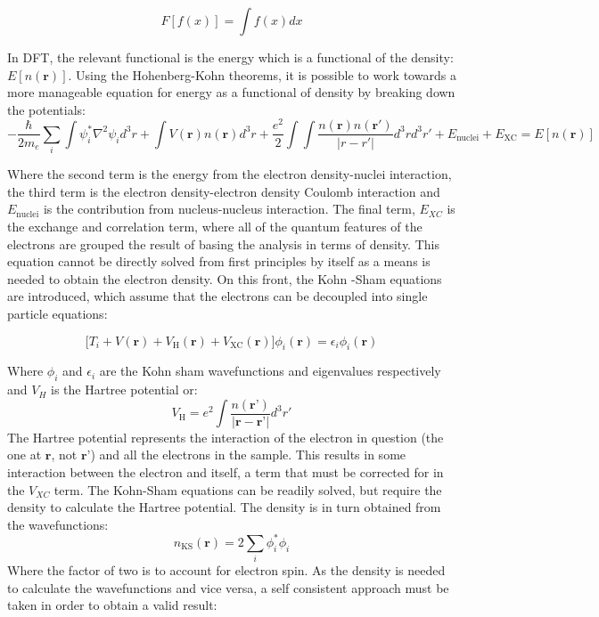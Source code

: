\begin{equation}
F[f(x)] = \int f(x) dx
\end{equation}

 In DFT, the relevant functional is the energy which is a functional of the density: $E[n(\textbf{r})]$.  Using the Hohenberg-Kohn theorems, it is possible to work towards a more manageable equation for energy as a functional of density by breaking down the potentials: 
\begin{equation}
-\frac{\hbar}{2m_e} \sum_{i} \int \psi_i^* \nabla^2\psi_id^3r + \int V(\textbf{r})n(\textbf{r})d^3r + \frac{e^2}{2} \int \int \frac{n(\textbf{r})n(\textbf{r}')}{|r-r'|}d^3r d^3r' + E_{\mathrm{nuclei}} + E_{\mathrm{XC}} = E[n(\textbf{r})]
\end{equation}

Where the second term is the energy from the electron density-nuclei interaction, the third term is the electron density-electron density Coulomb interaction and $E_{\mathrm{nuclei}}$ is the contribution from nucleus-nucleus interaction.  The final term, $E_{XC}$ is the exchange and correlation term, where all of the quantum features of the electrons are grouped the result of basing the analysis in terms of density. This equation cannot be directly solved from first principles by itself as a means is needed to obtain the electron density.  On this front, the Kohn -Sham equations are introduced, which assume that the electrons can be decoupled into single particle equations: 

\begin{equation}
    \bigg[T_i + V(\textbf{r}) + V_{\mathrm{H}}(\textbf{r}) + V_{\mathrm{XC}}(\textbf{r})\bigg] \phi_i(\textbf{r}) = \epsilon_i \phi_i(\textbf{r})
    \label{ks_eq}
\end{equation}

Where $\phi_i$ and $\epsilon_i$ are the Kohn sham wavefunctions and eigenvalues respectively and $V_H$ is the Hartree potential or: 
\begin{equation}
    V_\mathrm{H} = e^2 \int \frac{n(\textbf{r'})}{|\textbf{r}-\textbf{r'}|}d^3r'
\end{equation}
The Hartree potential represents the interaction of the electron in question (the one at $\textbf{r}$, not $\textbf{r'}$) and all the electrons in the sample.  This results in some interaction between the electron and itself, a term that must be corrected for in the $V_{XC}$ term.  The Kohn-Sham equations can  be readily solved, but require the density to calculate the Hartree potential.  The density is in turn obtained from the wavefunctions: 
\begin{equation}
	n_{\mathrm{KS}}(\textbf{r}) = 2 \sum_{i} \phi_i^*\phi_i
	\label{KS_density}
\end{equation}
Where the factor of two is to account for electron spin.  As the density is needed to calculate the wavefunctions and vice versa, a self consistent approach must be taken in order to obtain a valid result:  

